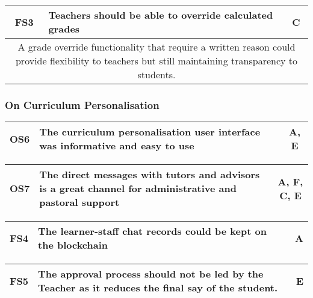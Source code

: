 \begin{table}[!ht]
	\begin{tabularx}{\textwidth}{|c|X|c|}
		\hline
		FS3 & \textbf{Teachers should be able to override calculated grades} & C \\
		\hline
		\multicolumn{3}{|X|}{
			A grade override functionality that require a written reason could provide
			flexibility to teachers but still maintaining transparency to students.
		}                                                                        \\
		\hline
	\end{tabularx}
\end{table}

\subsubsection{On Curriculum Personalisation}

\begin{table}[!ht]
	\begin{tabularx}{\textwidth}{|c|X|c|}
		\hline
		OS6 & \textbf{The curriculum personalisation user interface was informative and easy to use} & A, E \\
		\hline
	\end{tabularx}
\end{table}

\begin{table}[!ht]
	\begin{tabularx}{\textwidth}{|c|X|c|}
		\hline
		OS7 & \textbf{The direct messages with tutors and advisors is a great channel for administrative and pastoral support} & A, F, C, E \\
		\hline
	\end{tabularx}
\end{table}

\begin{table}[!ht]
	\begin{tabularx}{\textwidth}{|c|X|c|}
		\hline
		FS4 & \textbf{The learner-staff chat records could be kept on the blockchain} & A \\
		\hline
	\end{tabularx}
\end{table}

\begin{table}[!ht]
	\begin{tabularx}{\textwidth}{|c|X|c|}
		\hline
		FS5 & \textbf{The approval process should not be led by the Teacher as it reduces the final say of the student.} & E \\
		\hline
	\end{tabularx}
\end{table}


